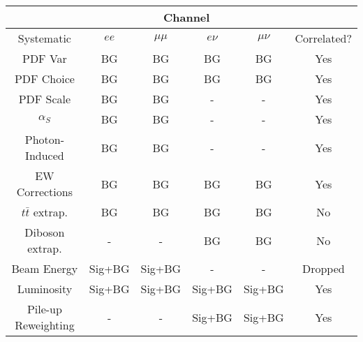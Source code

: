 \begin{center}
  \begin{tabular}{ |c|c|c|c|c|c| } 
    \hline
    \hline
    & \multicolumn{4}{c|}{Channel} & \\
    \hline
    Systematic &  $ee$ & $\mu\mu$ & $e\nu$ & $\mu\nu$ & Correlated?  \\
    \hline
    PDF Var & BG & BG & BG & BG & Yes \\
    PDF Choice & BG & BG & BG & BG & Yes \\
    PDF Scale & BG & BG & - & - & Yes \\
    $\alpha_{S}$ & BG & BG & - & - & Yes \\
    Photon-Induced & BG & BG & - & - & Yes \\
    EW Corrections & BG & BG & BG & BG & Yes \\
    $t\bar{t}$ extrap. & BG & BG & BG & BG & No \\
    Diboson extrap. & - & - & BG & BG & No \\
    Beam Energy & Sig+BG & Sig+BG & - & - & Dropped \\
    Luminosity & Sig+BG & Sig+BG & Sig+BG & Sig+BG & Yes \\
    Pile-up Reweighting & - & - & Sig+BG & Sig+BG & Yes \\
    \hline
    \hline
  \end{tabular}
\end{center}
